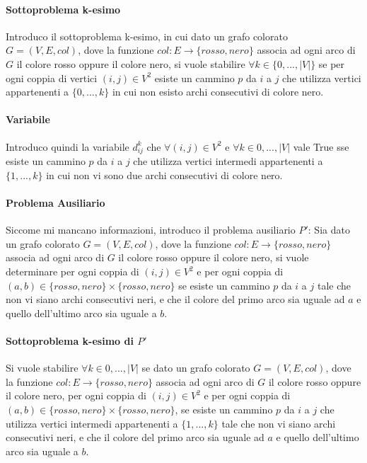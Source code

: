 \documentclass[12pt, a4paper, openany]{book}
\begin{document}
\paragraph*{Sottoproblema k-esimo}
Introduco il sottoproblema k-esimo, in cui dato un grafo colorato $G=(V,E,col)$, dove la funzione $col:E\to \{rosso,nero\}$ associa ad ogni arco di $G$ il colore rosso oppure il colore nero,
si vuole stabilire  $\forall k\in \{0,...,|V|\}$ se per ogni coppia di vertici $(i,j) \in V^2$ esiste un cammino $p$ da $i$ a $j$ che utilizza vertici appartenenti a $\{0,...,k\}$ in cui non esisto archi consecutivi di colore nero.

\paragraph*{Variabile}
Introduco quindi la variabile $d_{ij}^k$ che $\forall (i,j) \in V^2$ e $\forall k\in {0,...,|V|}$ vale True sse esiste un cammino $p$ da $i$ a $j$ che utilizza vertici intermedi appartenenti a $\{1,...,k\}$ in cui non vi sono due archi consecutivi di colore nero.

\paragraph*{Problema Ausiliario} 
Siccome mi mancano informazioni, introduco il problema ausiliario $P'$:
Sia dato un grafo colorato $G=(V,E,col)$, dove la funzione $col:E\to \{rosso,nero\}$ associa ad ogni arco di $G$ il colore rosso oppure il colore nero,
si vuole determinare per ogni coppia di $(i,j) \in V^2$ e per ogni coppia di $(a,b)\in \{rosso,nero\}\times \{rosso,nero\}$ se esiste un cammino $p$ da $i$ a $j$ tale che 
non vi siano archi consecutivi neri, e che il colore del primo arco sia uguale ad $a$ e quello dell'ultimo arco sia uguale a $b$.

\paragraph*{Sottoproblema k-esimo di $P'$}
Si vuole stabilire $\forall k \in {0,...,|V|}$ se dato un grafo colorato $G=(V,E,col)$, dove la funzione $col:E\to \{rosso,nero\}$ associa ad ogni arco di $G$ il colore rosso oppure il colore nero,
per ogni coppia di $(i,j) \in V^2$ e per ogni coppia di $(a,b)\in \{rosso,nero\}\times \{rosso,nero\}$,  se esiste un cammino $p$ da $i$ a $j$ che utilizza vertici intermedi appartenenti a $\{1,...,k\}$ tale che
non vi siano archi consecutivi neri, e che il colore del primo arco sia uguale ad $a$ e quello dell'ultimo arco sia uguale a $b$.
\end{document}
